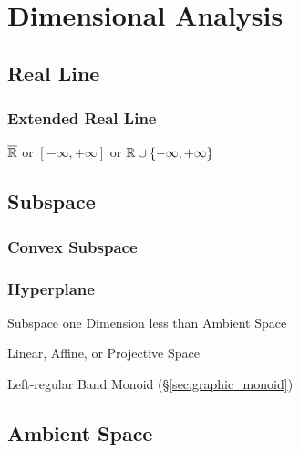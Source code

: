 \section{Dimensional Analysis}\label{sec:dimensional_analysis}

\subsection{Real Line}\label{sec:real_line}

\subsubsection{Extended Real Line}\label{sec:extended_real_line}

$\overline{\mathbb{R}}$ or $[-\infty, +\infty]$ or $\mathbb{R} \cup \{
-\infty, +\infty\}$



\subsection{Subspace}\label{sec:subspace}




\subsubsection{Convex Subspace}\label{sec:convex_subspace}

\subsubsection{Hyperplane}\label{sec:hyperplane}

Subspace one Dimension less than Ambient Space

Linear, Affine, or Projective Space %

Left-regular Band Monoid (\S\ref{sec:graphic_monoid})



\subsection{Ambient Space}\label{sec:ambient_space}

